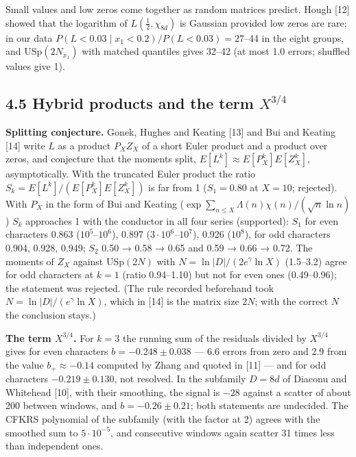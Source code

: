 \documentclass[
  10pt,
]{article}
\begin{document}
Small values and low zeros come together as random matrices predict.
Hough {[}12{]} showed that the logarithm of \(L(\tfrac12, \chi_{8d})\)
is Gaussian provided low zeros are rare; in our data
\(P(L < 0.03 \mid x_1 < 0.2)/P(L < 0.03) = 27\)--44 in the eight groups,
and USp\((2N_{x_1})\) with matched quantiles gives 32--42 (at most 1.0
errors; shuffled values give 1).

\hypertarget{hybrid-products-and-the-term-x34}{%
\subsection{\texorpdfstring{4.5 Hybrid products and the term
\(X^{3/4}\)}{4.5 Hybrid products and the term X\^{}\{3/4\}}}\label{hybrid-products-and-the-term-x34}}

\textbf{Splitting conjecture.} Gonek, Hughes and Keating {[}13{]} and
Bui and Keating {[}14{]} write \(L\) as a product \(P_X Z_X\) of a short
Euler product and a product over zeros, and conjecture that the moments
split, \(E[L^k] \approx E[P_X^k]E[Z_X^k]\), asymptotically. With the
truncated Euler product the ratio \(S_k = E[L^k]/(E[P_X^k]E[Z_X^k])\) is
far from 1 (\(S_1 = 0.80\) at \(X = 10\); rejected). With \(P_X\) in the
form of Bui and Keating
(\(\exp\sum_{n \le X}\Lambda(n)\chi(n)/(\sqrt n\ln n)\)) \(S_k\)
approaches 1 with the conductor in all four series (supported): \(S_1\)
for even characters 0.863 (\(10^5\)--\(10^6\)), 0.897
(\(3\cdot10^6\)--\(10^7\)), 0.926 (\(10^8\)), for odd characters 0.904,
0.928, 0.949; \(S_2\) 0.50 → 0.58 → 0.65 and 0.59 → 0.66 → 0.72. The
moments of \(Z_X\) against USp\((2N)\) with
\(N = \ln|D|/(2e^\gamma\ln X)\) (1.5--3.2) agree for odd characters at
\(k = 1\) (ratio 0.94--1.10) but not for even ones (0.49--0.96); the
statement was rejected. (The rule recorded beforehand took
\(N = \ln|D|/(e^\gamma\ln X)\), which in {[}14{]} is the matrix size
\(2N\); with the correct \(N\) the conclusion stays.)

\textbf{The term \(X^{3/4}\).} For \(k = 3\) the running sum of the
residuals divided by \(X^{3/4}\) gives for even characters
\(b = -0.248 \pm 0.038\) --- 6.6 errors from zero and 2.9 from the value
\(b_+ \approx -0.14\) computed by Zhang and quoted in {[}11{]} --- and
for odd characters \(-0.219 \pm 0.130\), not resolved. In the subfamily
\(D = 8d\) of Diaconu and Whitehead {[}10{]}, with their smoothing, the
signal is \(-28\) against a scatter of about 200 between windows, and
\(b = -0.26 \pm 0.21\); both statements are undecided. The CFKRS
polynomial of the subfamily (with the factor at 2) agrees with the
smoothed sum to \(5\cdot10^{-5}\), and consecutive windows again scatter
31 times less than independent ones.
\end{document}
